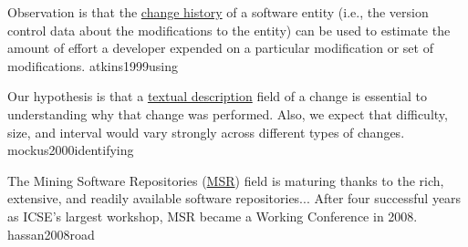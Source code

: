 \documentclass{article}
\begin{document}
  {Observation is that the \ul{change history} of a software entity (i.e., the version control data about the modifications to the entity) can be used to estimate the amount of effort a developer expended on a particular modification or set of modifications.}
  {atkins1999using}

  {Our hypothesis is that a \ul{textual description} field of a change is essential to understanding why that change was performed. Also, we expect that difficulty, size, and interval would vary strongly across different types of changes.}
  {mockus2000identifying}


  {The Mining Software Repositories (\ul{MSR}) field is maturing thanks to the rich, extensive, and readily available software repositories... After four successful years as ICSE's largest workshop, MSR became a Working Conference in 2008.}
  {hassan2008road}
\end{document}
